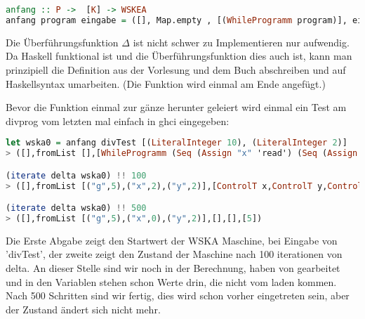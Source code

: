 \documentclass[11pt,a4paper,ngerman]{article}
\begin{document}
\begin{lstlisting}[language=haskell]
anfang :: P ->  [K] -> WSKEA
anfang program eingabe = ([], Map.empty , [(WhileProgramm program)], eingabe, [])
\end{lstlisting}

Die Überführungsfunktion $\Delta$ ist nicht schwer zu Implementieren nur aufwendig. Da Haskell funktional ist und die Überführungsfunktion dies auch ist, kann man prinzipiell die Definition aus der Vorlesung und dem Buch abschreiben und auf Haskellsyntax umarbeiten. (Die Funktion wird einmal am Ende angefügt.)

Bevor die Funktion einmal zur gänze herunter geleiert wird einmal ein Test am divprog vom letzten mal einfach in ghci eingegeben:
\begin{lstlisting}[language=haskell]
let wska0 = anfang divTest [(LiteralInteger 10), (LiteralInteger 2)]
> ([],fromList [],[WhileProgramm (Seq (Assign "x" 'read') (Seq (Assign "y" 'read') (Seq (Assign "g" 0) (Seq (While (x>=y) (Seq (Assign "g" (g+1)) (Assign "x" (x-y)))) (TOut g)))))],[10,2],[])

(iterate delta wska0) !! 100
> ([],fromList [("g",5),("x",2),("y",2)],[ControlT x,ControlT y,ControlOp -,ControlC (AssignC "x"),ControlB (x>=y),ControlC WhileC,ControlB (x>=y),WhileProgramm (Seq (Assign "g" (g+1)) (Assign "x" (x-y))),WhileProgramm (TOut g)],[],[])

(iterate delta wska0) !! 500
> ([],fromList [("g",5),("x",0),("y",2)],[],[],[5])
\end{lstlisting}

Die Erste Abgabe zeigt den Startwert der WSKA Maschine, bei Eingabe von 'divTest', der zweite zeigt den Zustand der Maschine nach 100 iterationen von delta. An dieser Stelle sind wir noch in der Berechnung, haben von gearbeitet und in den Variablen stehen schon Werte drin, die nicht vom laden kommen. Nach 500 Schritten sind wir fertig, dies wird schon vorher eingetreten sein, aber der Zustand ändert sich nicht mehr.\\
\end{document}
